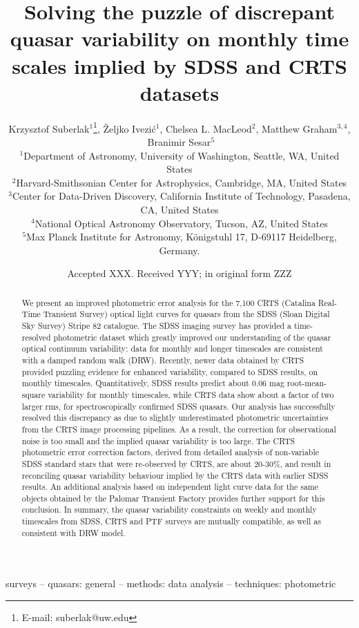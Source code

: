 \documentclass[fleqn,usenatbib]{mnras}
\title[Quasar Variability]{Solving the puzzle of discrepant quasar variability on monthly time scales implied by SDSS and CRTS datasets}
\author[K. Suberlak et al.]{
Krzysztof Suberlak$^{1}$\thanks{E-mail: suberlak@uw.edu},
\v{Z}eljko Ivezi\'c$^{1}$,
Chelsea L. MacLeod$^{2}$,
Matthew Graham$^{3,4}$, 
\newauthor
$\, \,  $Branimir Sesar$^{5}$
\\
$^{1}$Department of Astronomy, University of Washington, Seattle, WA, United States\\
$^{2}$Harvard-Smithsonian Center for Astrophysics, Cambridge, MA, United States\\
$^{3}$Center for Data-Driven Discovery, California Institute of Technology, Pasadena, CA, United States\\
$^{4}$National Optical Astronomy Observatory, Tucson, AZ, United States\\
$^{5}$Max Planck Institute for Astronomy, K\"{o}nigstuhl 17, D-69117 Heidelberg, Germany. 
}
\date{Accepted XXX. Received YYY; in original form ZZZ}
\begin{document}
\label{firstpage}
\pagerange{\pageref{firstpage}--\pageref{lastpage}}
\maketitle

\begin{abstract}
We present an improved photometric error analysis for the 7,100 CRTS (Catalina Real-Time Transient Survey)  optical  light curves for quasars from the SDSS (Sloan Digital Sky Survey) Stripe 82 catalogue. The SDSS imaging survey  has provided a time-resolved photometric  dataset which greatly improved our understanding of the quasar optical continuum variability: data for monthly and longer timescales  are consistent with a damped random walk (DRW). Recently, newer data  obtained by CRTS provided  puzzling evidence for enhanced variability, compared to SDSS  results, on monthly timescales. Quantitatively, SDSS results predict  about 0.06 mag root-mean-square variability  for monthly timescales, while CRTS data show about a factor of two larger rms, for spectroscopically confirmed SDSS quasars. Our analysis has successfully resolved this discrepancy as due to slightly underestimated photometric uncertainties from the CRTS image processing pipelines. As a result, the correction for observational noise is too small and the implied quasar variability is too large. The CRTS photometric error correction factors, derived from detailed analysis of non-variable SDSS standard stars that were re-observed by CRTS, are about 20-30\%, and result in reconciling  quasar variability behaviour implied by the CRTS data with earlier SDSS results. An additional analysis based on independent light curve data for the same objects obtained by the Palomar Transient Factory provides further support for this conclusion. In summary, the quasar variability constraints on weekly and monthly timescales from SDSS, CRTS and PTF surveys are mutually compatible, as well as consistent with DRW model.
\end{abstract}

\begin{keywords}
surveys -- quasars: general -- methods: data analysis -- techniques: photometric
\end{keywords}



\end{document}
